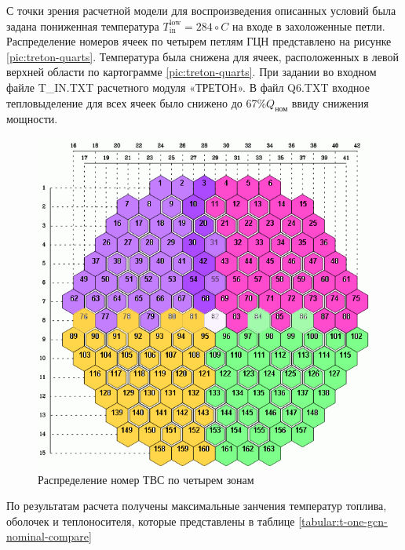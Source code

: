 С точки зрения расчетной модели для воспроизведения описанных условий была задана пониженная температура $T_{\text{in}}^{\text{low}}=284 \circ C$ на входе в захоложенные петли. Распределение номеров ячеек по четырем петлям ГЦН представлено на рисунке \ref{pic:treton-quarts}. Температура была снижена для ячеек, расположенных в левой верхней области по картограмме \ref{pic:treton-quarts}. При задании во входном файле T\_IN.TXT расчетного модуля «ТРЕТОН». В файл Q6.TXT входное тепловыделение для всех ячеек было снижено до 67\%$Q_{\text{ном}}$ ввиду снижения мощности. 

\begin{figure}[H]
	\begin{center}
		\includegraphics[scale=0.5]{quarts.jpg}
		\caption{Распределение номер ТВС по четырем зонам}
		\label{pic:treton-quartz}
	\end{center}
\end{figure}

По результатам расчета получены максимальные занчения температур топлива, оболочек и теплоносителя, которые представлены в таблице \ref{tabular:t-one-gcn-nominal-compare}

